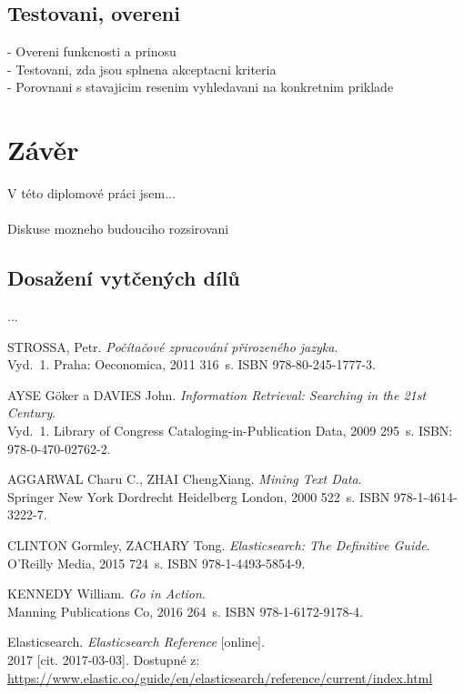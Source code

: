 \documentclass[FM,DP]{tulthesis}
\begin{document}
\section{Testovani, overeni}
- Overeni funkcnosti a prinosu\\
- Testovani, zda jsou splnena akceptacni kriteria\\
- Porovnani s stavajicim resenim vyhledavani na konkretnim priklade


\chapter{Závěr}

V této diplomové práci jsem...\\
\\
Diskuse mozneho budouciho rozsirovani

\section{Dosažení vytčených dílů}
...


\begin{thebibliography}{Mm99}

 STROSSA, Petr. \emph{Počítačové zpracování přirozeného jazyka}. \\
Vyd.~1. Praha: Oeconomica, 2011 316~s. ISBN 978-80-245-1777-3.

 AYSE Göker a DAVIES John. \emph{Information Retrieval: Searching in the 21st Century}. \\
Vyd.~1. Library of Congress Cataloging-in-Publication Data, 2009 295~s. ISBN: 978-0-470-02762-2.

 AGGARWAL Charu C., ZHAI ChengXiang. \emph{Mining Text Data}. \\
Springer New York Dordrecht Heidelberg London, 2000 522~s. ISBN 978-1-4614-3222-7.

 CLINTON Gormley, ZACHARY Tong. \emph{Elasticsearch: The Definitive Guide}. \\
O'Reilly Media, 2015 724~s. ISBN 978-1-4493-5854-9.

 KENNEDY William. \emph{Go in Action}. \\
Manning Publications Co, 2016 264~s. ISBN 978-1-6172-9178-4.

 Elasticsearch. \emph{Elasticsearch Reference} [online]. \\
2017 [cit. 2017-03-03]. Dostupné z:\\
\url{https://www.elastic.co/guide/en/elasticsearch/reference/current/index.html}

\end{thebibliography}
\end{document}
